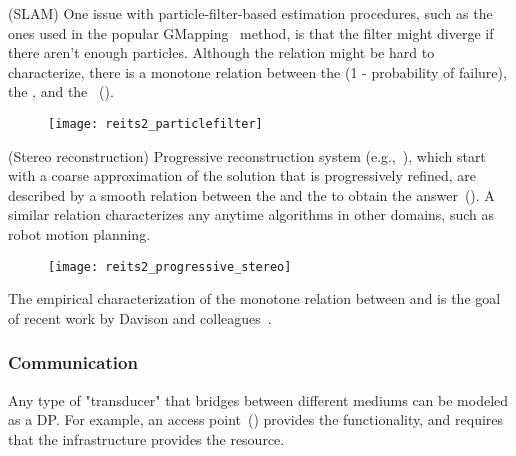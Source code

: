 \begin{example}
(SLAM) One issue with particle-filter-based estimation procedures,
such as the ones used in the popular GMapping~\cite{grisetti07improved}
method, is that the filter might diverge if there aren't enough particles.
Although the relation might be hard to characterize, there is a monotone
relation between the  (1 - probability of failure),
the , and the ~().
\end{example}

\begin{figure}[h]
    \centering
\texttt{[image: reits2\_particlefilter]}
\caption{\label{fig:gmapping} }
\end{figure}



\begin{example}
(Stereo reconstruction) Progressive reconstruction system (e.g.,~\cite{locher16progressive}),
which start with a coarse approximation of the solution that is progressively
refined, are described by a smooth relation between the 
and the  to obtain the answer~().
A similar relation characterizes any anytime algorithms in other domains,
such as robot motion planning.
\end{example}

\begin{figure}[h]
    \centering
    \texttt{[image: reits2\_progressive\_stereo]}
    \caption{\label{fig:progressive}}
\end{figure}

\begin{example}
The empirical characterization of the monotone relation between  and 
is the goal of recent work by Davison and colleagues~\cite{nardi15introducing,zia16comparative}.
\end{example}


\subsubsection{Communication}

\begin{example}[Transducers]
Any type of "transducer" that bridges between different
mediums can be modeled as a DP. For example, an access point~()
provides the  functionality, and requires
that the infrastructure provides the  resource.
\end{example}

